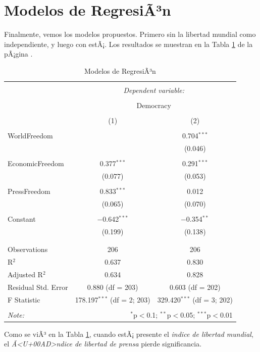\documentclass{article}
\begin{document}
\clearpage

\section{Modelos de RegresiÃ³n}

Finalmente, vemos los modelos propuestos. Primero sin la libertad mundial como independiente, y luego con estÃ¡. Los resultados se muestran en la Tabla \ref{regresiones} de la pÃ¡gina \pageref{regresiones}.



\begin{table}[!htbp] \centering 
  \caption{Modelos de RegresiÃ³n} 
  \label{regresiones} 
\begin{tabular}{@{\extracolsep{5pt}}lcc} 
\\[-1.8ex]\hline 
\hline \\[-1.8ex] 
 & \multicolumn{2}{c}{\textit{Dependent variable:}} \\ 
\cline{2-3} 
\\[-1.8ex] & \multicolumn{2}{c}{Democracy} \\ 
\\[-1.8ex] & (1) & (2)\\ 
\hline \\[-1.8ex] 
 WorldFreedom &  & 0.704$^{***}$ \\ 
  &  & (0.046) \\ 
  & & \\ 
 EconomicFreedom & 0.377$^{***}$ & 0.291$^{***}$ \\ 
  & (0.077) & (0.053) \\ 
  & & \\ 
 PressFreedom & 0.833$^{***}$ & 0.012 \\ 
  & (0.065) & (0.070) \\ 
  & & \\ 
 Constant & $-$0.642$^{***}$ & $-$0.354$^{**}$ \\ 
  & (0.199) & (0.138) \\ 
  & & \\ 
\hline \\[-1.8ex] 
Observations & 206 & 206 \\ 
R$^{2}$ & 0.637 & 0.830 \\ 
Adjusted R$^{2}$ & 0.634 & 0.828 \\ 
Residual Std. Error & 0.880 (df = 203) & 0.603 (df = 202) \\ 
F Statistic & 178.197$^{***}$ (df = 2; 203) & 329.420$^{***}$ (df = 3; 202) \\ 
\hline 
\hline \\[-1.8ex] 
\textit{Note:}  & \multicolumn{2}{r}{$^{*}$p$<$0.1; $^{**}$p$<$0.05; $^{***}$p$<$0.01} \\ 
\end{tabular} 
\end{table} 
Como se viÃ³ en la Tabla \ref{regresiones}, cuando estÃ¡ presente el \emph{indice de libertad mundial}, el \emph{Ã<U+00AD>ndice de libertad de prensa} pierde significancia.
\end{document}
